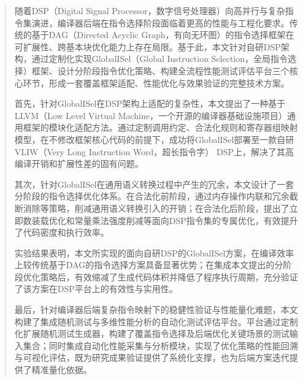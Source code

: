 \documentclass[type=master]{fduthesis}
\begin{document}
	
	
	\frontmatter
	
	\tableofcontents
	
	\begin{abstract}
	随着DSP（Digital Signal Processor，数字信号处理器）向高并行与复杂指令集演进，编译器后端在指令选择阶段面临着更高的性能与工程化要求。传统的基于DAG（Directed Acyclic Graph，有向无环图）的指令选择框架在可扩展性、跨基本块优化能力上存在局限。基于此，本文针对自研DSP架构，通过定制化实现GlobalISel（Global Instruction Selection，全局指令选择）框架、设计分阶段指令优化策略、构建全流程性能测试评估平台三个核心环节，形成一套覆盖框架适配、性能优化与效果验证的完整技术方案。
	
	首先，针对GlobalISel在DSP架构上适配的复杂性，本文提出了一种基于LLVM（Low Level Virtual Machine，一个开源的编译器基础设施项目）通用框架的模块化适配方法。通过定制调用约定、合法化规则和寄存器组映射模型，在不修改框架核心代码的前提下，成功将GlobalISel部署至一款自研VLIW（Very Long Instruction Word，超长指令字） DSP上，解决了其高编译开销和扩展性差的固有问题。
	
	其次，针对GlobalISel在通用语义转换过程中产生的冗余，本文设计了一套分阶段的指令选择优化体系。在合法化前阶段，通过内存操作内联和冗余截断消除等策略，削减通用语义转换引入的开销；在合法化后阶段，提出了立即数装载优化和常量乘法强度削减等面向DSP指令集的专属优化，有效提升了代码密度和执行效率。
	
	实验结果表明，本文所实现的面向自研DSP的GlobalISel方案，在编译效率上较传统基于DAG的指令选择方案具备显著优势；在集成本文提出的分阶段优化策略后，有效缩减了生成代码体积并降低了程序执行周期，充分验证了该方案在DSP平台上的有效性与实用性。
	
	最后，针对编译器后端复杂指令映射下的稳健性验证与性能量化难题，本文构建了集成随机测试与多维性能分析的自动化测试评估平台。平台通过定制化扩展随机测试生成器，构建了覆盖指令选择及后端优化关键场景的测试输入集合；同时集成自动化性能采集与分析模块，实现了优化策略的性能回溯与可视化评估，既为研究成果验证提供了系统化支撑，也为后端方案迭代提供了精准量化依据。
	\end{abstract}
	
\end{document}
